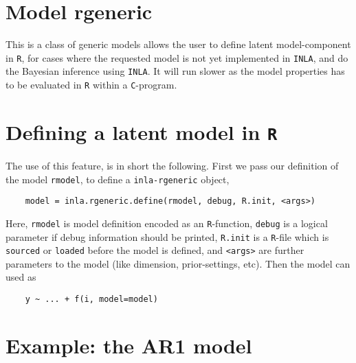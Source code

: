 \documentclass[a4paper,11pt]{article}
\begin{document}
\section*{Model \textbf{rgeneric}}

This is a class of generic models allows the user to define latent
model-component in \texttt{R}, for cases where the requested model is
not yet implemented in \texttt{INLA}, and do the Bayesian inference
using \texttt{INLA}. It will run slower as the model properties has to
be evaluated in \texttt{R} within a \texttt{C}-program.

\section*{Defining a latent model in \texttt{R}}

The use of this feature, is in short the following. First we pass our
definition of the model \texttt{rmodel}, to define a
\texttt{inla-rgeneric} object,
{\small
\begin{verbatim}
    model = inla.rgeneric.define(rmodel, debug, R.init, <args>)
\end{verbatim}
} Here, \texttt{rmodel} is model definition encoded as an
\texttt{R}-function, \texttt{debug} is a logical parameter if debug
information should be printed, \texttt{R.init} is a \texttt{R}-file
which is \texttt{sourced} or \texttt{loaded} before the model is
defined, and \texttt{<args>} are further parameters to the model (like
dimension, prior-settings, etc).  Then the model can used as {\small
\begin{verbatim}
    y ~ ... + f(i, model=model)
\end{verbatim}
}

\section*{Example: the AR1 model}
\end{document}
